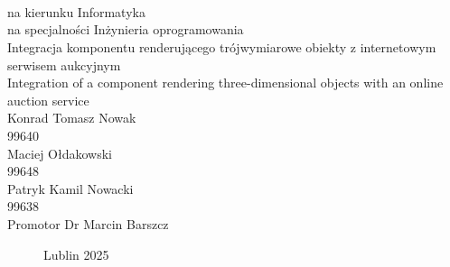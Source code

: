 \documentclass[12pt,a4paper]{article}
\def\blankpage{%
      \clearpage%
      \thispagestyle{empty}%
      \null%
      \clearpage}
\newcommand{\newCharapter}[1]{\newpage }
\begin{document}



\begin{titlepage}
    \titlepagefont
     \\
    \vspace{4cm}
    \break
    \fontsize{1.4cm}{1.4cm} \\
    \fontsize{1.4cm}{1.4cm} \\
    \vspace{0.5cm}
    \break
    \normalsize{} na kierunku Informatyka \\
    na specjalności Inżynieria oprogramowania \\
    \vspace{1cm}
    \break
    \large
    Integracja komponentu renderującego trójwymiarowe obiekty z internetowym serwisem aukcyjnym \\
    \break
    Integration of a component rendering three-dimensional objects with an online auction service \\
    \vspace{1.5cm}
    \break
    Konrad Tomasz Nowak \\[0.3cm]
    99640   \\[0.3cm]
    Maciej Ołdakowski \\[0.3cm]
    99648   \\[0.3cm]
    Patryk Kamil Nowacki \\[0.3cm]
    99638   \\[0.3cm]
    \vspace{1cm}
    \break
    \normalsize{}
    Promotor Dr Marcin Barszcz
    \vspace*{\fill}
    \begin{figure}[bbp]
        {\titlepagefont Lublin 2025}
    \end{figure}
\end{titlepage}

\onehalfspacing
\blankpage

\newCharapter{chapters/0abstract}
\setcounter{figure}{0}
\end{document}
